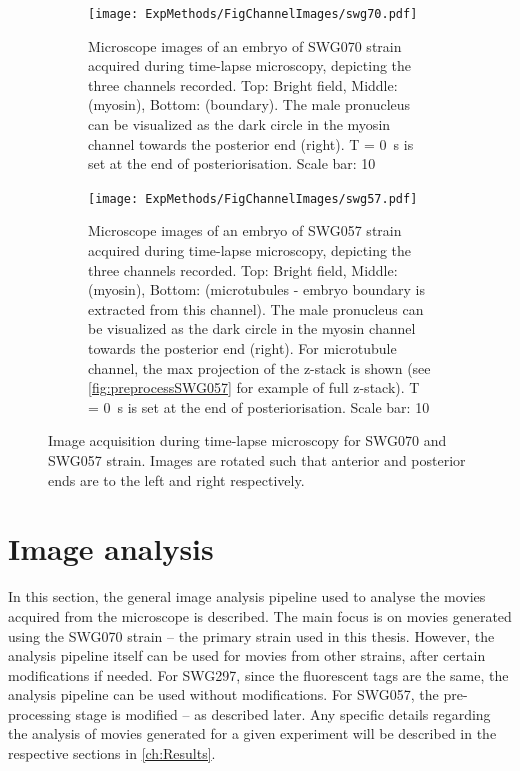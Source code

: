 \begin{figure}[p]
\centering
\begin{subfigure}{\textwidth}
    \centering
    \texttt{[image: ExpMethods/FigChannelImages/swg70.pdf]}
    \caption{Microscope images of an embryo of SWG070 strain acquired during time-lapse microscopy, depicting the three channels recorded. Top: Bright field, Middle:  (myosin), Bottom:  (boundary). The male pronucleus can be visualized as the dark circle in the myosin channel towards the posterior end (right). T = \SI{0}{\second} is set at the end of posteriorisation. Scale bar: \SI{10}{\unitLength}} 
    \label{subfig:imageAcquisition-swg070}
\end{subfigure}
\hfill
\begin{subfigure}{\textwidth}
    \centering
    \texttt{[image: ExpMethods/FigChannelImages/swg57.pdf]}
    \caption{Microscope images of an embryo of SWG057 strain acquired during time-lapse microscopy, depicting the three channels recorded. Top: Bright field, Middle:  (myosin), Bottom:  (microtubules - embryo boundary is extracted from this channel). The male pronucleus can be visualized as the dark circle in the myosin channel towards the posterior end (right). For microtubule channel, the max projection of the z-stack is shown (see \autoref{fig:preprocessSWG057} for example of full z-stack). T = \SI{0}{\second} is set at the end of posteriorisation. Scale bar: \SI{10}{\unitLength}} 
    \label{subfig:imageAcquisition-swg057}
\end{subfigure}
\caption[Image acquisition]{Image acquisition during time-lapse microscopy for SWG070 and SWG057 strain. Images are rotated such that anterior and posterior ends are to the left and right respectively.}
\label{fig:imageAcquisition}
\end{figure}

\section{Image analysis}\label{sec:imageAnalysis}
In this section, the general image analysis pipeline used to analyse the movies acquired from the microscope is described. The main focus is on movies generated using the SWG070 strain -- the primary strain used in this thesis. However, the analysis pipeline itself can be used for movies from other strains, after certain modifications if needed. For SWG297, since the fluorescent tags are the same, the analysis pipeline can be used without modifications. For SWG057, the pre-processing stage is modified --  as described later. Any specific details regarding the analysis of movies generated for a given experiment will be described in the respective sections in \autoref{ch:Results}.

